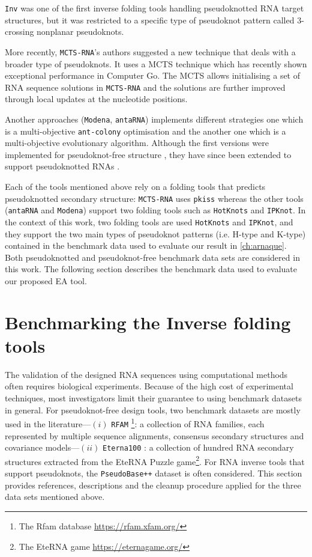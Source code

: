 \texttt{Inv} was one of the first inverse folding tools handling pseudoknotted \ac{RNA} target structures, but it was restricted to a specific type of pseudoknot pattern called $3$-crossing nonplanar pseudoknots.

More recently, \texttt{MCTS-RNA}'s authors suggested a new technique that deals with a broader type of pseudoknots. It uses a \ac{MCTS} technique which has recently shown exceptional performance in Computer Go. The \ac{MCTS} allows initialising a set of \ac{RNA} sequence solutions in \texttt{MCTS-RNA} and the solutions are further improved through local updates at the nucleotide positions.

Another approaches (\texttt{Modena}, \texttt{antaRNA}) implements different strategies one which is a multi-objective \texttt{ant-colony} optimisation and the another one which is a multi-objective evolutionary algorithm.  Although the first versions were implemented for pseudoknot-free structure \cite{taneda2011modena, kleinkauf2015antarna}, they have since been extended to support pseudoknotted \acp{RNA} \cite{modena_2012, kleinkauf2015antarna2}. 

Each of the tools mentioned above rely on a folding tools that predicts pseudoknotted secondary structure: \texttt{MCTS-RNA} uses \texttt{pkiss} whereas the other tools (\texttt{antaRNA} and \texttt{Modena}) support two folding tools such as \texttt{HotKnots} and \texttt{IPKnot}. In the context of this work, two folding tools are used \texttt{HotKnots} and \texttt{IPKnot}, and they support the two main types of pseudoknot patterns (i.e. H-type and K-type) contained in the benchmark data used to evaluate our result in \autoref{ch:arnaque}. Both pseudoknotted and pseudoknot-free benchmark data sets are considered in this work. The following section describes the benchmark data used to evaluate our proposed \ac{EA} tool.

\section{Benchmarking the Inverse folding tools}
\label{sec:benchmark_data}
The validation of the designed \ac{RNA} sequences using computational methods often requires biological experiments. Because of the high cost of experimental techniques, most investigators limit their guarantee to using benchmark datasets \cite{churkin2017design} in general. For pseudoknot-free design tools,  two benchmark datasets are mostly used in the literature---$(i)$ \texttt{RFAM} \footnote{The Rfam database \url{https://rfam.xfam.org/}}: a collection of \ac{RNA} families, each represented by multiple sequence alignments, consensus secondary structures and covariance models---$(ii)$ \texttt{Eterna100} \cite{anderson2016principles}: a collection of hundred \ac{RNA} secondary structures extracted from the EteRNA Puzzle game\footnote{The EteRNA game \url{https://eternagame.org/}}. For \ac{RNA} inverse tools that support pseudoknots, the \texttt{PseudoBase++}\cite{taufer2009pseudobase++} dataset is often considered. This section provides references, descriptions and the cleanup procedure applied for the three data sets mentioned above.


